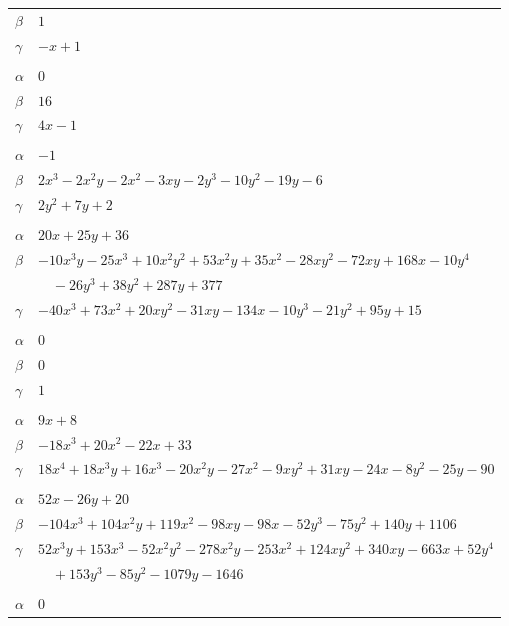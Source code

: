 \documentclass[11pt]{article}
\begin{document}
\begin{longtable}{@{}ll@{}}
$\beta$ & $1$\\
$\gamma$ & $-x+1$\\
\addlinespace[3pt]
\multicolumn{2}{@{}l}{$\{i,j\}=\{50,93\}$, $k_{ij}=3\cdot 7$}\\
$\alpha$ & $0$\\
$\beta$ & $16$\\
$\gamma$ & $4x-1$\\
\addlinespace[3pt]
\multicolumn{2}{@{}l}{$\{i,j\}=\{66,78\}$, $k_{ij}=1$}\\
$\alpha$ & $-1$\\
$\beta$ & $2x^{3}-2x^{2}y-2x^{2}-3xy-2y^{3}-10y^{2}-19y-6$\\
$\gamma$ & $2y^{2}+7y+2$\\
\addlinespace[3pt]
\multicolumn{2}{@{}l}{$\{i,j\}=\{74,78\}$, $k_{ij}=3^{2}$}\\
$\alpha$ & $20x+25y+36$\\
$\beta$ & $-10x^{3}y-25x^{3}+10x^{2}y^{2}+53x^{2}y+35x^{2}-28xy^{2}-72xy+168x-10y^{4}$\\
 & $\quad -26y^{3}+38y^{2}+287y+377$\\
$\gamma$ & $-40x^{3}+73x^{2}+20xy^{2}-31xy-134x-10y^{3}-21y^{2}+95y+15$\\
\addlinespace[3pt]
\multicolumn{2}{@{}l}{$\{i,j\}=\{74,86\}$, $k_{ij}=3$}\\
$\alpha$ & $0$\\
$\beta$ & $0$\\
$\gamma$ & $1$\\
\addlinespace[3pt]
\multicolumn{2}{@{}l}{$\{i,j\}=\{78,84\}$, $k_{ij}=1$}\\
$\alpha$ & $9x+8$\\
$\beta$ & $-18x^{3}+20x^{2}-22x+33$\\
$\gamma$ & $18x^{4}+18x^{3}y+16x^{3}-20x^{2}y-27x^{2}-9xy^{2}+31xy-24x-8y^{2}-25y-90$\\
\addlinespace[3pt]
\multicolumn{2}{@{}l}{$\{i,j\}=\{78,104\}$, $k_{ij}=2\cdot 3$}\\
$\alpha$ & $52x-26y+20$\\
$\beta$ & $-104x^{3}+104x^{2}y+119x^{2}-98xy-98x-52y^{3}-75y^{2}+140y+1106$\\
$\gamma$ & $52x^{3}y+153x^{3}-52x^{2}y^{2}-278x^{2}y-253x^{2}+124xy^{2}+340xy-663x+52y^{4}$\\
 & $\quad +153y^{3}-85y^{2}-1079y-1646$\\
\addlinespace[3pt]
\multicolumn{2}{@{}l}{$\{i,j\}=\{86,92\}$, $k_{ij}=3$}\\
$\alpha$ & $0$\\

\end{longtable}
\end{document}
